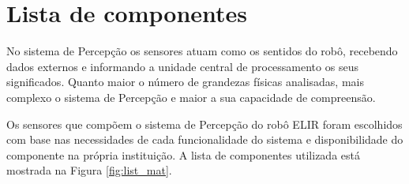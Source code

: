 %
%
%
%
%
%


\section{Lista de componentes}
\label{ssec:list}

No sistema de Percepção os sensores atuam como os sentidos do robô, recebendo dados externos e informando a unidade central de processamento os seus significados. Quanto maior o número de grandezas físicas analisadas, mais complexo o sistema de Percepção e maior a sua capacidade de compreensão. 

Os sensores que compõem o sistema de Percepção do robô ELIR foram escolhidos com base nas necessidades de cada funcionalidade do sistema e disponibilidade do componente na própria instituição. A lista de componentes utilizada está mostrada na Figura \ref{fig:list_mat}.

